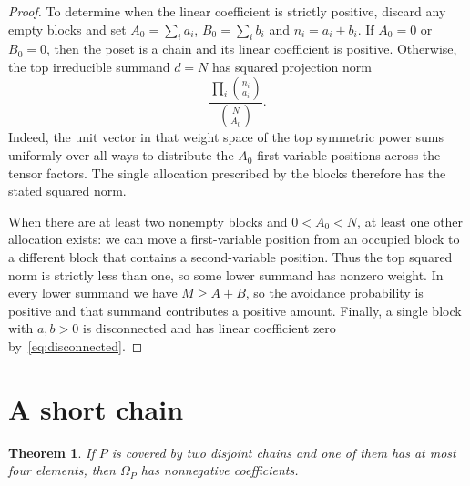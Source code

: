 \documentclass[11pt]{amsart}
\newtheorem{theorem}{Theorem}[section]
\theoremstyle{remark}
\numberwithin{equation}{section}
\begin{document}
\begin{proof}
To determine when the linear coefficient is strictly positive, discard any
empty blocks and set $A_0=\sum_ia_i$, $B_0=\sum_ib_i$ and $n_i=a_i+b_i$. If
$A_0=0$ or $B_0=0$, then the poset is a chain and its linear coefficient is
positive. Otherwise, the top irreducible summand $d=N$ has squared projection
norm
\[
 \frac{\prod_i\binom{n_i}{a_i}}{\binom N{A_0}}.
\]
Indeed, the unit vector in that weight space of the top symmetric power sums
uniformly over all ways to distribute the $A_0$ first-variable positions across
the tensor factors. The single allocation prescribed by the blocks therefore
has the stated squared norm.

When there are at least two nonempty blocks and $0<A_0<N$, at least one other
allocation exists: we can move a first-variable position from an occupied block
to a different block that contains a second-variable position. Thus the top
squared norm is strictly less than one, so some lower summand has nonzero
weight. In every lower summand we have $M\ge A+B$, so the avoidance
probability is positive and that summand contributes a positive amount.
Finally, a single block with $a,b>0$ is disconnected and has linear coefficient
zero by~\eqref{eq:disconnected}.
\end{proof}

\section{A short chain}\label{sec:short}

\begin{theorem}\label{thm:short}
If $P$ is covered by two disjoint chains and one of them has at most four
elements, then $\Omega_P$ has nonnegative coefficients.
\end{theorem}
\end{document}
